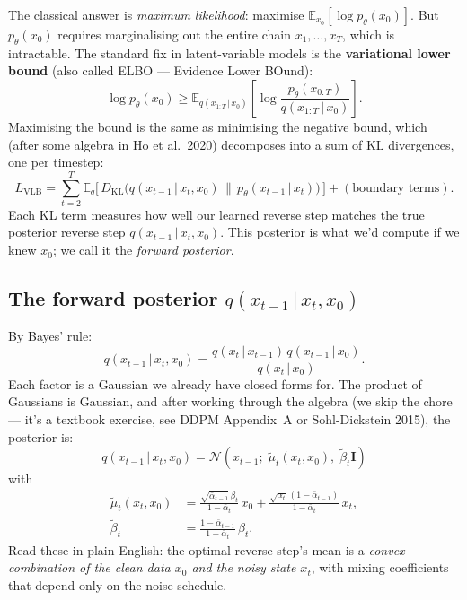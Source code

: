 \documentclass[11pt,a4paper]{article}
\newcommand{\E}{\mathbb{E}}
\newcommand{\N}{\mathcal{N}}
\newcommand{\given}{\,|\,}
\begin{document}
The classical answer is \emph{maximum likelihood}: maximise
$\E_{x_0}[\log p_\theta(x_0)]$. But $p_\theta(x_0)$ requires marginalising
out the entire chain $x_1, \ldots, x_T$, which is intractable. The
standard fix in latent-variable models is the \textbf{variational
lower bound} (also called ELBO --- Evidence Lower BOund):
\[
\log p_\theta(x_0) \geq \E_{q(x_{1:T} \given x_0)}\!\left[
   \log \frac{p_\theta(x_{0:T})}{q(x_{1:T} \given x_0)}\right].
\]
Maximising the bound is the same as minimising the negative bound,
which (after some algebra in Ho et al.\ 2020) decomposes into a sum of
KL divergences, one per timestep:
\begin{equation}
L_{\text{VLB}} = \sum_{t=2}^{T}
\E_{q}\!\big[\, D_{\mathrm{KL}}\!\big(q(x_{t-1}\given x_t, x_0)\,\|\,p_\theta(x_{t-1}\given x_t)\big)\,\big]
+ (\text{boundary terms}).
\label{eq:vlb}
\end{equation}
Each KL term measures how well our learned reverse step matches the
true posterior reverse step $q(x_{t-1}\given x_t, x_0)$. This posterior
is what we'd compute if we knew $x_0$; we call it the \emph{forward
posterior}.

\subsection{The forward posterior $q(x_{t-1} \given x_t, x_0)$}

By Bayes' rule:
\[
q(x_{t-1} \given x_t, x_0)
   = \frac{q(x_t \given x_{t-1})\, q(x_{t-1} \given x_0)}{q(x_t \given x_0)}.
\]
Each factor is a Gaussian we already have closed forms for. The product
of Gaussians is Gaussian, and after working through the algebra (we
skip the chore --- it's a textbook exercise, see DDPM Appendix~A or
Sohl-Dickstein 2015), the posterior is:
\begin{equation}
\boxed{\;q(x_{t-1} \given x_t, x_0) = \N(x_{t-1};\; \tilde\mu_t(x_t, x_0),\; \tilde\beta_t\mathbf{I})\;}
\end{equation}
with
\begin{align}
\tilde\mu_t(x_t, x_0) &=
   \frac{\sqrt{\bar{\alpha}_{t-1}}\,\beta_t}{1-\bar{\alpha}_t}\, x_0
   + \frac{\sqrt{\alpha_t}\,(1-\bar{\alpha}_{t-1})}{1-\bar{\alpha}_t}\, x_t, \label{eq:tilde-mu}\\
\tilde\beta_t &= \frac{1-\bar{\alpha}_{t-1}}{1-\bar{\alpha}_t}\,\beta_t. \label{eq:tilde-beta}
\end{align}
Read these in plain English: the optimal reverse step's mean is a
\emph{convex combination of the clean data $x_0$ and the noisy state
$x_t$}, with mixing coefficients that depend only on the noise schedule.
\end{document}
